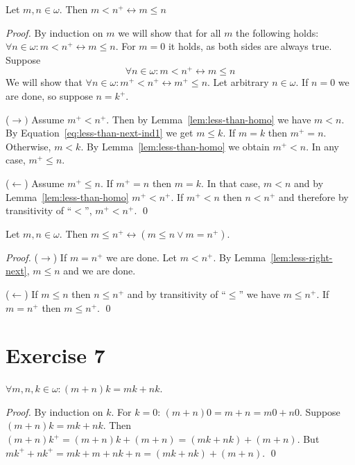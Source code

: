 \documentclass[11pt]{llncs}
\begin{document}
\begin{lemma}\label{lem:less-right-next}
  Let $m, n \in \omega$. Then
  $m < n^+ \leftrightarrow m \leq n$
\end{lemma}
\begin{proof}
  By induction on $m$ we will show that for all $m$ the following holds:
  $\forall n \in \omega: m < n^+ \leftrightarrow m \leq n$.
  For $m = 0$ it holds, as both sides are always true. Suppose
  \begin{equation}\label{eq:less-than-next-ind1}
    \forall n \in \omega: m < n^+ \leftrightarrow m \leq n
  \end{equation}
  We will show that
  $\forall n \in \omega: m^+ < n^+ \leftrightarrow m^+ \leq n$.
  Let arbitrary $n \in \omega$. If $n = 0$ we are done, so suppose $n = k^+$.

  \item{($\rightarrow)$}
  Assume $m^+ < n^+$. Then by Lemma~\ref{lem:less-than-homo} we have
  $m < n$. By Equation~\ref{eq:less-than-next-ind1} we get $m \leq k$.
  If $m = k$ then $m^+ = n$. Otherwise, $m < k$.
  By Lemma~\ref{lem:less-than-homo} we obtain $m^+ < n$. In any case,
  $m^+ \leq n$.

  \item{($\leftarrow$)}
  Assume $m^+ \leq n$. If $m^+ = n$ then $m = k$. In that case, $m < n$
  and by Lemma~\ref{lem:less-than-homo} $m^+ < n^+$.
  If $m^+ < n$ then $n < n^+$ and
  therefore by transitivity of ``$<$'', $m^+ < n^+$.
  \qed
\end{proof}

\begin{lemma}
  Let $m, n \in \omega$. Then
  $m \leq n^+ \leftrightarrow (m \leq n \lor m = n^+)$.
\end{lemma}
\begin{proof}
  \item{($\rightarrow$)}
  If $m = n^+$ we are done. Let $m < n^+$. By Lemma~\ref{lem:less-right-next},
  $m \leq n$ and we are done.

  \item({$\leftarrow$})
  If $m \leq n$ then $n \leq n^+$ and by transitivity of ``$\leq$'' we have
  $m \leq n^+$. If $m = n^+$ then $m \leq n^+$.
  \qed
\end{proof}

\section*{Exercise 7}
\begin{lemma}
  $\forall m, n, k \in \omega: (m + n)k = mk + nk$.
\end{lemma}
\begin{proof}
  By induction on $k$. For $k = 0$: $(m + n)0 = m + n = m0 + n0$.
  Suppose $(m + n)k = mk + nk$. Then
  $(m + n)k^+ = (m + n)k + (m + n) = (mk + nk) + (m + n)$.
  But $mk^+ + nk^+ = mk + m + nk + n = (mk + nk) + (m + n)$.
  \qed
\end{proof}
\end{document}
